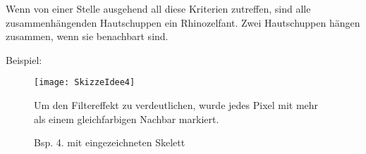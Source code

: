 Wenn von einer Stelle ausgehend all diese Kriterien zutreffen, sind alle zusammenhängenden Hautschuppen ein Rhinozelfant. Zwei Hautschuppen hängen zusammen, wenn sie benachbart sind.

\clearpage
Beispiel: \vspace{3em}
\begin{figure}[!ht]
	\centering
	\texttt{[image: SkizzeIdee4]}
	\caption {Bsp. 4. mit eingezeichneten Skelett}
	Um den Filtereffekt zu verdeutlichen, wurde jedes Pixel mit mehr als einem gleichfarbigen Nachbar markiert.
\end{figure}